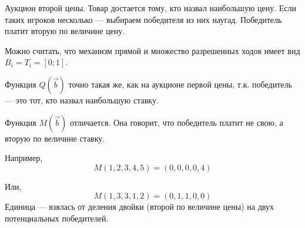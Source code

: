 \begin{myex} Аукцион второй цены. Товар достается тому, кто назвал наибольшую цену. Если таких игроков несколько --- выбираем победителя из них наугад. Победитель платит вторую по величине цену.

Можно считать, что механизм прямой и множество разрешенных ходов имеет вид $B_{i}=T_{i}=[0;1] $. 

Функция $ Q(\vec{b}) $ точно такая же, как на аукционе первой цены, т.к. победитель --- это тот, кто назвал наибольшую ставку. 

Функция $ M(\vec{b}) $ отличается. Она говорит, что победитель платит не свою, а вторую по величине ставку. 

Например,
\begin{equation}
M(1,2,3,4,5)=(0,0,0,0,4)
\end{equation}

Или,
\begin{equation}
M(1,3,3,1,2)=(0,1,1,0,0)
\end{equation}
Единица --- взялась от деления двойки (второй по величине цены) на двух потенциальных победителей.

\end{myex}


